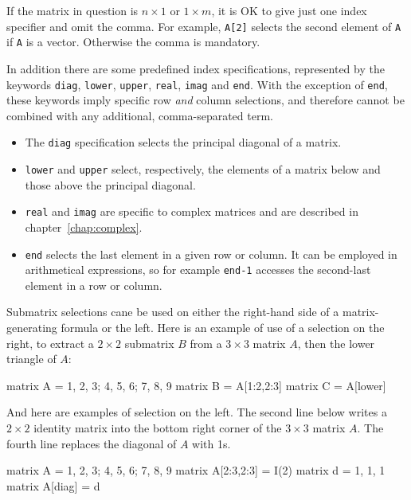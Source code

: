 If the matrix in question is $n\times 1$ or $1\times m$, it is
OK to give just one index specifier and omit the comma. For example,
\texttt{A[2]} selects the second element of \texttt{A} if \texttt{A}
is a vector. Otherwise the comma is mandatory.

In addition there are some predefined index specifications,
represented by the keywords \texttt{diag}, \texttt{lower},
\texttt{upper}, \texttt{real}, \texttt{imag} and \texttt{end}. With
the exception of \texttt{end}, these keywords imply specific row
\textit{and} column selections, and therefore cannot be combined with
any additional, comma-separated term.

\begin{itemize}
\item The \texttt{diag} specification selects the principal diagonal
  of a matrix.
\item \texttt{lower} and \texttt{upper} select, respectively, the
  elements of a matrix below and those above the principal diagonal.
\item \texttt{real} and \texttt{imag} are specific to complex matrices
  and are described in chapter~\ref{chap:complex}.
\item \texttt{end} selects the last element in a given row or column.
  It can be employed in arithmetical expressions, so for example
  \texttt{end-1} accesses the second-last element in a row or column.
\end{itemize}

Submatrix selections cane be used on either the right-hand side of a
matrix-generating formula or the left.  Here is an example of use of a
selection on the right, to extract a $2\times 2$ submatrix $B$ from a
$3\times 3$ matrix $A$, then the lower triangle of $A$:
%
\begin{code}
matrix A = {1, 2, 3; 4, 5, 6; 7, 8, 9}
matrix B = A[1:2,2:3]
matrix C = A[lower]
\end{code}
%
And here are examples of selection on the left.  The second line below
writes a $2\times 2$ identity matrix into the bottom right corner of the
$3\times 3$ matrix $A$.  The fourth line replaces the diagonal of $A$ 
with 1s.
%
\begin{code}
matrix A = {1, 2, 3; 4, 5, 6; 7, 8, 9}
matrix A[2:3,2:3] = I(2)
matrix d = {1, 1, 1}
matrix A[diag] = d
\end{code}


